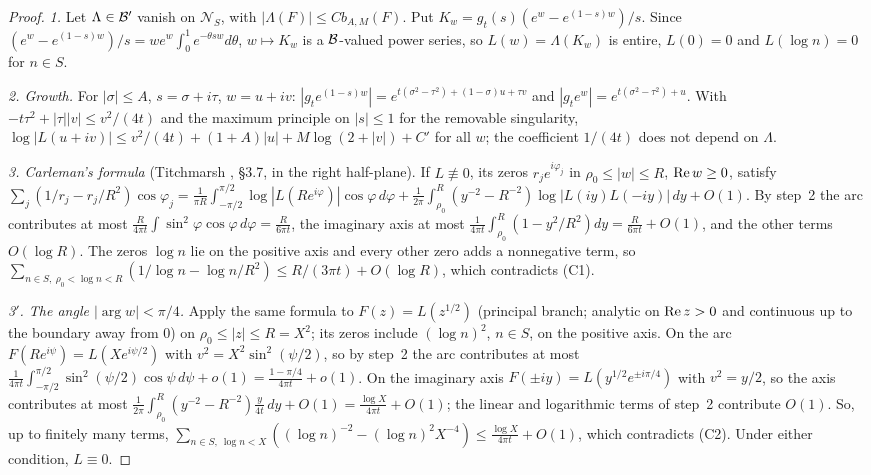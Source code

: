 \begin{proof}
\emph{1.} Let $\Lambda\in\mathcal{B}'$ vanish on $\mathcal{N}_S$, with $|\Lambda(F)|\le Cb_{A,M}(F)$. Put $K_w=g_t(s)(e^w-e^{(1-s)w})/s$. Since $(e^w-e^{(1-s)w})/s=we^w\int_0^1e^{-\theta sw}d\theta$, $w\mapsto K_w$ is a $\mathcal{B}$-valued power series, so $L(w)=\Lambda(K_w)$ is entire, $L(0)=0$ and $L(\log n)=0$ for $n\in S$.

\emph{2. Growth.} For $|\sigma|\le A$, $s=\sigma+i\tau$, $w=u+iv$: $|g_te^{(1-s)w}|=e^{t(\sigma^2-\tau^2)+(1-\sigma)u+\tau v}$ and $|g_te^w|=e^{t(\sigma^2-\tau^2)+u}$. With $-t\tau^2+|\tau||v|\le v^2/(4t)$ and the maximum principle on $|s|\le1$ for the removable singularity, $\log|L(u+iv)|\le v^2/(4t)+(1+A)|u|+M\log(2+|v|)+C'$ for all $w$; the coefficient $1/(4t)$ does not depend on $\Lambda$.

\emph{3. Carleman's formula} (Titchmarsh \cite{TitchmarshTF}, §3.7, in the right half-plane). If $L\not\equiv0$, its zeros $r_je^{i\varphi_j}$ in $\rho_0\le|w|\le R$, $\operatorname{Re} w\ge0$, satisfy $\sum_j(1/r_j-r_j/R^2)\cos\varphi_j=\frac1{\pi R}\int_{-\pi/2}^{\pi/2}\log|L(Re^{i\varphi})|\cos\varphi\,d\varphi+\frac1{2\pi}\int_{\rho_0}^R(y^{-2}-R^{-2})\log|L(iy)L(-iy)|\,dy+O(1)$. By step~2 the arc contributes at most $\frac R{4\pi t}\int\sin^2\varphi\cos\varphi\,d\varphi=\frac R{6\pi t}$, the imaginary axis at most $\frac1{4\pi t}\int_{\rho_0}^R(1-y^2/R^2)dy=\frac R{6\pi t}+O(1)$, and the other terms $O(\log R)$. The zeros $\log n$ lie on the positive axis and every other zero adds a nonnegative term, so $\sum_{n\in S,\ \rho_0<\log n<R}(1/\log n-\log n/R^2)\le R/(3\pi t)+O(\log R)$, which contradicts (C1).

\emph{3$'$. The angle $|\arg w|<\pi/4$.} Apply the same formula to $F(z)=L(z^{1/2})$ (principal branch; analytic on $\operatorname{Re} z>0$ and continuous up to the boundary away from $0$) on $\rho_0\le|z|\le R=X^2$; its zeros include $(\log n)^2$, $n\in S$, on the positive axis. On the arc $F(Re^{i\psi})=L(Xe^{i\psi/2})$ with $v^2=X^2\sin^2(\psi/2)$, so by step~2 the arc contributes at most $\frac1{4\pi t}\int_{-\pi/2}^{\pi/2}\sin^2(\psi/2)\cos\psi\,d\psi+o(1)=\frac{1-\pi/4}{4\pi t}+o(1)$. On the imaginary axis $F(\pm iy)=L(y^{1/2}e^{\pm i\pi/4})$ with $v^2=y/2$, so the axis contributes at most $\frac1{2\pi}\int_{\rho_0}^R(y^{-2}-R^{-2})\frac y{4t}\,dy+O(1)=\frac{\log X}{4\pi t}+O(1)$; the linear and logarithmic terms of step~2 contribute $O(1)$. So, up to finitely many terms, $\sum_{n\in S,\ \log n<X}((\log n)^{-2}-(\log n)^2X^{-4})\le\frac{\log X}{4\pi t}+O(1)$, which contradicts (C2). Under either condition, $L\equiv0$.


\end{proof}
